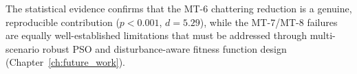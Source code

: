 The statistical evidence confirms that the MT-6 chattering reduction is a genuine, reproducible contribution ($p < 0.001$, $d = 5.29$), while the MT-7/MT-8 failures are equally well-established limitations that must be addressed through multi-scenario robust PSO and disturbance-aware fitness function design (Chapter~\ref{ch:future_work}).

